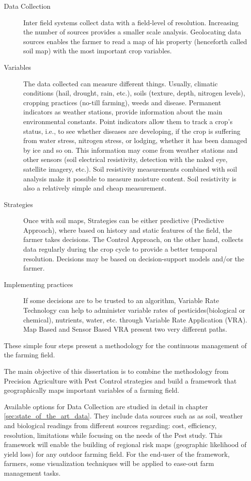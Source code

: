 \begin{description}
\item [Data Collection] Inter field systems collect data with a field-level of resolution. Increasing the number of sources provides a smaller scale analysis. Geolocating data sources enables the farmer to read a map of his property (henceforth called soil map) with the most important crop variables.
\item [Variables] The data collected can measure different things. Usually, climatic conditions (hail, drought, rain, etc.), soils (texture, depth, nitrogen levels), cropping practices (no-till farming), weeds and disease. Permanent indicators as weather stations, provide information about the main environmental constants. Point indicators allow them to track a crop’s status, i.e., to see whether diseases are developing, if the crop is suffering from water stress, nitrogen stress, or lodging, whether it has been damaged by ice and so on. This information may come from weather stations and other sensors (soil electrical resistivity, detection with the naked eye, satellite imagery, etc.). Soil resistivity measurements combined with soil analysis make it possible to measure moisture content. Soil resistivity is also a relatively simple and cheap measurement.
\item [Strategies] Once with soil maps, Strategies can be either predictive (Predictive Approach), where   based on history and static features of the field, the farmer takes decisions. The Control Approach, on the other hand, collects data regularly during the crop cycle to provide a better temporal resolution. Decisions may be based on decision-support models and/or the farmer.
\item [Implementing practices] If some decisions are to be trusted to an algorithm, Variable Rate Technology can help to administer variable rates of pesticides(biological or chemical), nutrients, water, etc. through Variable Rate Application (VRA). Map Based and Sensor Based VRA present two very different paths.
\end{description}	

These simple four steps present a methodology for the continuous management of the farming field.

The main objective of this dissertation is to combine the methodology from Precision Agriculture with Pest Control strategies and build a framework that geographically maps important variables of a farming field.

Available options for Data Collection are studied in detail in chapter \ref{sec:state_of_the_art_data}. They include data sources such as as soil, weather and biological readings from different sources regarding: cost, efficiency, resolution, limitations while focusing on the needs of the Pest study. This framework will enable the building of regional risk maps (geographic likelihood of yield loss) for any outdoor farming field. For the end-user of the framework, farmers, some visualization techniques will be applied to ease-out farm management tasks.

